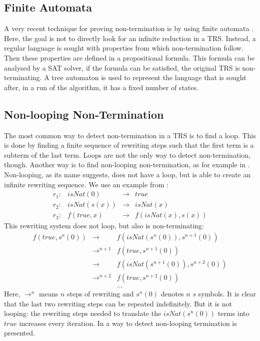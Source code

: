 \subsection*{Finite Automata}
A very recent technique for proving non-termination is by using finite automata \cite{ENDRULLIS:AUTOMATA}. Here, the goal is not to directly look for an infinite reduction in a TRS. Instead, a regular language is sought with properties from which non-termination follow. Then these properties are defined in a propositional formula. This formula can be analysed by a SAT solver, if the formula can be satisfied, the original TRS is non-terminating. A tree automaton is used to represent the language that is sought after, in a run of the algorithm, it has a fixed number of states. 

\subsection*{Non-looping Non-Termination}
The most common way to detect non-termination in a TRS is to find a loop. This is done by finding a finite sequence of rewriting steps such that the first term is a subterm of the last term. Loops are not the only way to detect non-termination, though. Another way is to find non-looping non-termination, as for example in \cite{emmes2012detecting}. Non-looping, as its name suggests, does not have a loop, but is able to create an infinite rewriting sequence. We use an example from \cite{emmes2012detecting}:
\[
\begin{array}{lrcl}
    r_1: & isNat(0) & \rightarrow & true \\
    r_2: & isNat(s(x)) & \rightarrow & isNat(x) \\
    r_3: & f(true, x) & \rightarrow & f(isNat(x), s(x))
\end{array}
\]
This rewriting system does not loop, but also is non-terminating:
\[
\begin{array}{lll}
f(true, s^n(0)) & \rightarrow       & f(isNat(s^n(0)), s^{n+1}(0)) \\
                & \rightarrow^{n+1} & f(true, s^{n+1}(0)) \\
                & \rightarrow       & f(isNat(s^{n+1}(0)), s^{n+2}(0)) \\
                & \rightarrow^{n+2} & f(true, s^{n+2}(0)) \\
                &                   & \dots
\end{array}
\]
Here, $\rightarrow^n$ means $n$ steps of rewriting and $s^{n}(0)$ denotes $n$ $s$ symbols. It is clear that the last two rewriting steps can be repeated indefinitely. But it is not looping: the rewriting steps needed to translate the $isNat(s^{n}(0))$ terms into $true$ increases every iteration. In \cite{emmes2012detecting} a way to detect non-looping termination is presented. 

